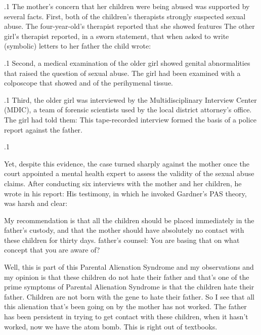 \documentclass[11pt, twoside]{article}
\begin{document}
{\p.1{%
The mother’s concern that her children were being abused was supported by several facts. First, both of the children’s therapists strongly suspected sexual abuse. The four-year-old’s therapist reported that she
showed features  The other girl’s therapist reported, in a
sworn statement, that when asked to write (symbolic) letters to her father the child wrote: 
}%

\p.1{%
Second, a medical examination of the older girl showed genital abnormalities that raised the question of sexual abuse. The girl had been
examined with a colposcope that showed  and  of the perihymenal
tis\-sue.
}%

\p.1{%
Third, the older girl was interviewed by the Multidisciplinary Interview Center (MDIC), a team of forensic scientists used by the local
district attorney’s office. The girl had told them:  This
tape-recorded interview formed the basis of a police report against the
father.
}%

\p.1{%
Yet, despite this evidence, the case turned sharply against the mother
once the court appointed a mental health expert to assess the validity of
the sexual abuse claims. After conducting six interviews with the mother
and her children, he wrote in his report:  His testimony, in
which he invoked Gardner’s PAS theory, was harsh and clear:

\begin{docDescription}


My recommendation is that all
the children should be placed immediately in the father’s custody, and that the mother should have absolutely no contact with these children for thirty days.
father’s counsel: You are basing that on what concept
that you are aware of?

Well, this is part of this Parental
Alienation Syndrome and my observations and my
opinion is that these children do not hate their father
and that’s one of the prime symptoms of Parental Alienation Syndrome is that the children hate their father.
Children are not born with the gene to hate their father.
So I see that all this alienation that’s been going on by
the mother has not worked. The father has been persistent in trying to get contact with these children, when
it hasn’t worked, now we have the atom bomb. This is
right out of textbooks.


\end{docDescription}}}
\end{document}
